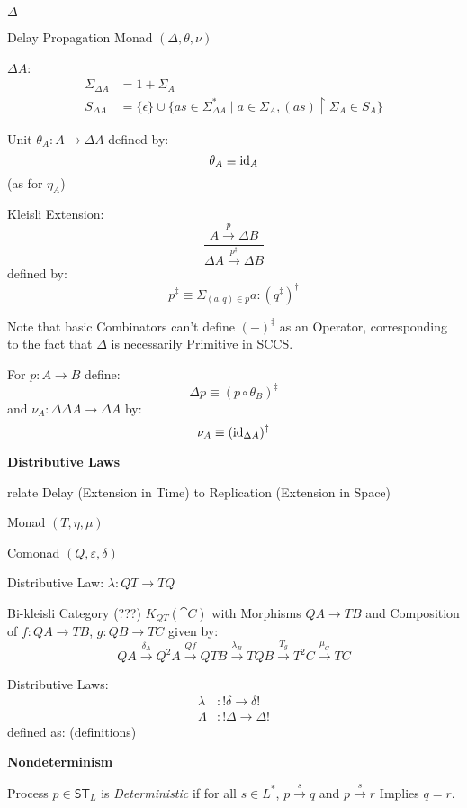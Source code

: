 $\Delta$

Delay Propagation Monad $(\Delta,\theta,\nu)$

$\Delta A$:
\begin{align*}
  \Sigma_{\Delta A} &= 1 + \Sigma_A \\
  S_{\Delta A} &= \{\epsilon\} \cup \{as \in \Sigma_{\Delta A}^*
    \mid a \in \Sigma_A, (as) \upharpoonright \Sigma_A \in S_A\}
\end{align*}

Unit $\theta_A : A \rightarrow \Delta A$ defined by:
\[
  \theta_A \equiv \mathrm{id}_A
\]
(as for $\eta_A$)

Kleisli Extension:
\[
  \frac{A \xrightarrow{p} \Delta B}
  {\Delta A \xrightarrow{p^\ddag} \Delta B}
\]
defined by:
\[
  p^\ddag \equiv \Sigma_{(a,q) \in p} a : (q^\ddag)^\dag
\]

\fist Note that basic Combinators can't define $(-)^\ddag$ as an
Operator, corresponding to the fact that $\Delta$ is necessarily
Primitive in SCCS.

For $p : A \rightarrow B$ define:
\[
  \Delta p \equiv (p \circ \theta_B)^\ddag
\]
and $\nu_A : \Delta \Delta A \rightarrow \Delta A$ by:
\[
  \nu_A \equiv (\mathrm{id}_{\Delta A})^\ddag
\]


\textbf{Distributive Laws}

relate Delay (Extension in Time) to Replication (Extension in Space)

Monad $(T,\eta,\mu)$

Comonad $(Q,\varepsilon,\delta)$

Distributive Law: $\lambda : Q T \rightarrow T Q$

Bi-kleisli Category (???) $K_{Q T}(\cat{C})$ with Morphisms $Q A
\rightarrow T B$ and Composition of $f : Q A \rightarrow T B$, $g : Q
B \rightarrow T C$ given by:
\[
  Q A \xrightarrow{\delta_A} Q^2 A \xrightarrow{Q f} Q T B
    \xrightarrow{\lambda_B} T Q B \xrightarrow{T_g} T^2 C
    \xrightarrow{\mu_C} T C
\]

Distributive Laws:
\begin{align*}
  \lambda &: !\delta \rightarrow \delta! \\
  \Lambda &: !\Delta \rightarrow \Delta!
\end{align*}
defined as: (definitions) %


\textbf{Nondeterminism}

Process $p \in \mathsf{ST}_L$ is \emph{Deterministic} if for all $s
\in L^*$, $p \xrightarrow{s} q$ and $p \xrightarrow{s} r$ Implies $q =
r$.

